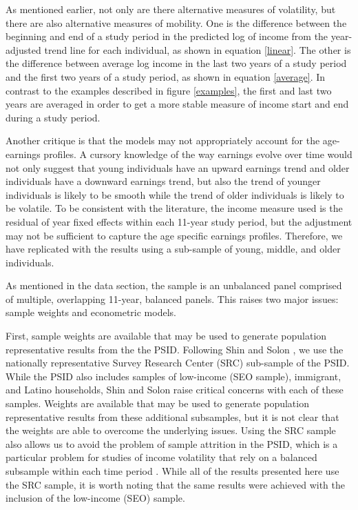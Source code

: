 \documentclass[12pt]{article}
\begin{document}
As mentioned earlier, not only are there alternative measures of volatility, but there are also alternative measures of mobility. One is the difference between the beginning and end of a study period in the predicted log of income from the year-adjusted trend line for each individual, as shown in equation \ref{linear}. The other is the difference between average log income in the last two years of a study period and the first two years of a study period, as shown in equation \ref{average}. In contrast to the examples described in figure \ref{examples}, the first and last two years are averaged in order to get a more stable measure of income start and end during a study period. 

Another critique is that the models may not appropriately account for the age-earnings profiles. A cursory knowledge of the way earnings evolve over time would not only suggest that young individuals have an upward earnings trend and older individuals have a downward earnings trend, but also the trend of younger individuals is likely to be smooth while the trend of older individuals is likely to be volatile. To be consistent with the literature, the income measure used is the residual of year fixed effects within each 11-year study period, but the adjustment may not be sufficient to capture the age specific earnings profiles. Therefore, we have replicated with the results using a sub-sample of young, middle, and older individuals. 

As mentioned in the data section, the sample is an unbalanced panel comprised of multiple, overlapping 11-year, balanced panels. This raises two major issues: sample weights and econometric models.

First, sample weights are available that may be used to generate population representative results from the the PSID. Following Shin and Solon \citeyearpar{shin_solon_2011}, we use the nationally representative Survey Research Center (SRC) sub-sample of the PSID. While the PSID also includes samples of low-income (SEO sample), immigrant, and Latino households, Shin and Solon raise critical concerns with each of these samples. Weights are available that may be used to generate population representative results from these additional subsamples, but it is not clear that the weights are able to overcome the underlying issues. Using the SRC sample also allows us to avoid the problem of sample attrition in the PSID, which is a particular problem for studies of income volatility that rely on a balanced subsample within each time period \citep{nichols_rehm_2014}. While all of the results presented here use the SRC sample, it is worth noting that the same results were achieved with the inclusion of the low-income (SEO) sample.
\end{document}
